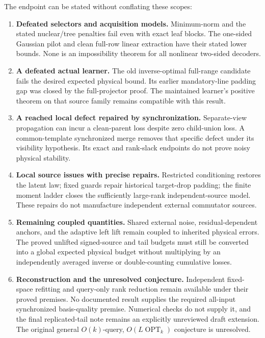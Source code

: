 \documentclass[11pt,oneside,openany,a4paper]{report}
\numberwithin{equation}{chapter}
\theoremstyle{definition}
\theoremstyle{remark}
\begin{document}
The endpoint can be stated without conflating these scopes:
\begin{enumerate}[leftmargin=*,label=\arabic*.]
 \item \textbf{Defeated selectors and acquisition models.}
 Minimum-norm and the stated nuclear/tree penalties fail even with
 exact leaf blocks.  The one-sided Gaussian pilot and clean full-row
 linear extraction have their stated lower bounds.  None is an
 impossibility theorem for all nonlinear two-sided decoders.
 \item \textbf{A defeated actual learner.}
 The old inverse-optimal full-range candidate fails the desired
 expected physical bound.  Its earlier mandatory-line padding gap was
 closed by the full-projector proof.  The maintained learner's positive
 theorem on that source family remains compatible with this result.
 \item \textbf{A reached local defect repaired by synchronization.}
 Separate-view propagation can incur a clean-parent loss despite zero
 child-union loss.  A common-template synchronized merge removes that
 specific defect under its visibility hypothesis.  Its exact and
 rank-slack endpoints do not prove noisy physical stability.
 \item \textbf{Local source issues with precise repairs.}
 Restricted conditioning restores the latent law; fixed guards repair
 historical target-drop padding; the finite moment ladder closes the
 sufficiently large-rank independent-source model.  These repairs do
 not manufacture independent external commutator sources.
 \item \textbf{Remaining coupled quantities.}
 Shared external noise, residual-dependent anchors, and the adaptive
 left lift remain coupled to inherited physical errors.  The proved
 unlifted signed-source and tail budgets must still be converted into
 a global expected physical budget without multiplying by an
 independently averaged inverse or double-counting cumulative losses.
 \item \textbf{Reconstruction and the unresolved conjecture.}
 Independent fixed-space refitting and query-only rank reduction remain
 available under their proved premises.  No documented result supplies
 the required all-input synchronized basis-quality premise.  Numerical
 checks do not supply it, and the final replicated-tail note remains
 an explicitly unreviewed draft extension.  The original general
 $O(k)$-query, $O(L\operatorname{OPT}_k)$ conjecture is unresolved.
\end{enumerate}
\end{document}
